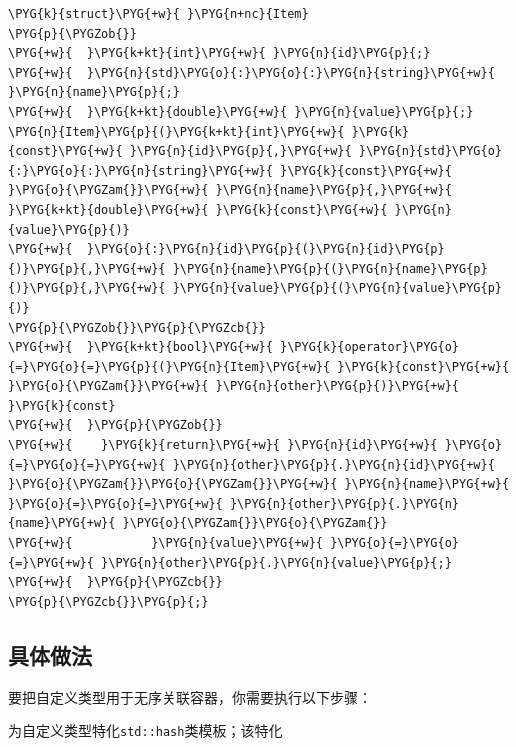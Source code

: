 \begin{codeblockbg}
\begin{Verbatim}[commandchars=\\\{\},breaklines=true,breakanywhere=true,fontsize=\codefont,xleftmargin=17bp]
\PYG{k}{struct}\PYG{+w}{ }\PYG{n+nc}{Item}
\PYG{p}{\PYGZob{}}
\PYG{+w}{  }\PYG{k+kt}{int}\PYG{+w}{ }\PYG{n}{id}\PYG{p}{;}
\PYG{+w}{  }\PYG{n}{std}\PYG{o}{:}\PYG{o}{:}\PYG{n}{string}\PYG{+w}{ }\PYG{n}{name}\PYG{p}{;}
\PYG{+w}{  }\PYG{k+kt}{double}\PYG{+w}{ }\PYG{n}{value}\PYG{p}{;}
\PYG{n}{Item}\PYG{p}{(}\PYG{k+kt}{int}\PYG{+w}{ }\PYG{k}{const}\PYG{+w}{ }\PYG{n}{id}\PYG{p}{,}\PYG{+w}{ }\PYG{n}{std}\PYG{o}{:}\PYG{o}{:}\PYG{n}{string}\PYG{+w}{ }\PYG{k}{const}\PYG{+w}{ }\PYG{o}{\PYGZam{}}\PYG{+w}{ }\PYG{n}{name}\PYG{p}{,}\PYG{+w}{ }\PYG{k+kt}{double}\PYG{+w}{ }\PYG{k}{const}\PYG{+w}{ }\PYG{n}{value}\PYG{p}{)}
\PYG{+w}{  }\PYG{o}{:}\PYG{n}{id}\PYG{p}{(}\PYG{n}{id}\PYG{p}{)}\PYG{p}{,}\PYG{+w}{ }\PYG{n}{name}\PYG{p}{(}\PYG{n}{name}\PYG{p}{)}\PYG{p}{,}\PYG{+w}{ }\PYG{n}{value}\PYG{p}{(}\PYG{n}{value}\PYG{p}{)}
\PYG{p}{\PYGZob{}}\PYG{p}{\PYGZcb{}}
\PYG{+w}{  }\PYG{k+kt}{bool}\PYG{+w}{ }\PYG{k}{operator}\PYG{o}{=}\PYG{o}{=}\PYG{p}{(}\PYG{n}{Item}\PYG{+w}{ }\PYG{k}{const}\PYG{+w}{ }\PYG{o}{\PYGZam{}}\PYG{+w}{ }\PYG{n}{other}\PYG{p}{)}\PYG{+w}{ }\PYG{k}{const}
\PYG{+w}{  }\PYG{p}{\PYGZob{}}
\PYG{+w}{    }\PYG{k}{return}\PYG{+w}{ }\PYG{n}{id}\PYG{+w}{ }\PYG{o}{=}\PYG{o}{=}\PYG{+w}{ }\PYG{n}{other}\PYG{p}{.}\PYG{n}{id}\PYG{+w}{ }\PYG{o}{\PYGZam{}}\PYG{o}{\PYGZam{}}\PYG{+w}{ }\PYG{n}{name}\PYG{+w}{ }\PYG{o}{=}\PYG{o}{=}\PYG{+w}{ }\PYG{n}{other}\PYG{p}{.}\PYG{n}{name}\PYG{+w}{ }\PYG{o}{\PYGZam{}}\PYG{o}{\PYGZam{}}
\PYG{+w}{           }\PYG{n}{value}\PYG{+w}{ }\PYG{o}{=}\PYG{o}{=}\PYG{+w}{ }\PYG{n}{other}\PYG{p}{.}\PYG{n}{value}\PYG{p}{;}
\PYG{+w}{  }\PYG{p}{\PYGZcb{}}
\PYG{p}{\PYGZcb{}}\PYG{p}{;}
\end{Verbatim}
\end{codeblockbg}



\subsection{具体做法}



要把自定义类型用于无序关联容器，你需要执行以下步骤：



为自定义类型特化\texttt{std::\allowbreak{}hash}类模板；该特化



